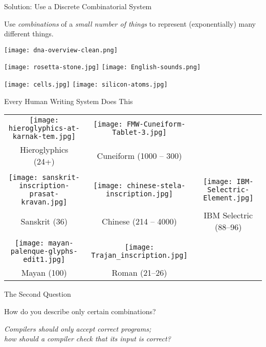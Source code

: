 \documentclass{plt}
\begin{document}
\begin{frame}{Solution: Use a Discrete Combinatorial System}

Use \emph{combinations} of a \emph{small number of things} to
represent (exponentially) many different things.

\begin{minipage}{0.2\textwidth}
\texttt{[image: dna-overview-clean.png]}
\end{minipage}%
\begin{minipage}{0.8\textwidth}
\hfill
\texttt{[image: rosetta-stone.jpg]} \hfill
\texttt{[image: English-sounds.png]}

\hfill
\texttt{[image: cells.jpg]}
\hfill
\texttt{[image: silicon-atoms.jpg]}
\end{minipage}

\end{frame}

\begin{frame}[fragile]{Every Human Writing System Does This}

\tiny

\begin{tabular}{ccc}
\texttt{[image: hieroglyphics-at-karnak-tem.jpg]} &
\texttt{[image: FMW-Cuneiform-Tablet-3.jpg]} \\
Hieroglyphics (24+) & Cuneiform (1000 -- 300) \\ \\
\texttt{[image: sanskrit-inscription-prasat-kravan.jpg]}
&
\texttt{[image: chinese-stela-inscription.jpg]}
&
\texttt{[image: IBM-Selectric-Element.jpg]}
\\
Sanskrit (36) & Chinese (214 -- 4000) & IBM Selectric (88--96) \\ \\
\texttt{[image: mayan-palenque-glyphs-edit1.jpg]} &
\texttt{[image: Trajan\_inscription.jpg]} \\
Mayan (100) & Roman (21--26) \\
\end{tabular}

\end{frame}

\begin{frame}{The Second Question}
  \begin{center}
    \large How do you describe only certain combinations?

    \vspace{5pc}

    \emph{Compilers should only accept correct programs; \\
      how should a compiler check that its input is correct?}

  \end{center}
\end{frame}
\end{document}
